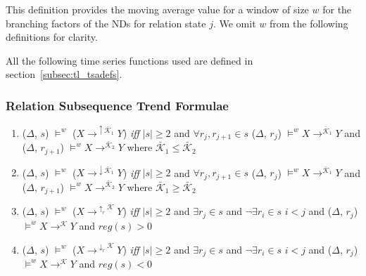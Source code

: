 This definition provides the moving average value for a window of size
$w$ for the branching
factors of the NDs for relation state $j$. We omit $w$ from the
following definitions for clarity. 

All the following time
series functions used are defined in section~\ref{subsec:tl_tsadefs}.

\subsubsection{Relation Subsequence Trend Formulae}

\begin{enumerate}

\item\label{item:ma_inc}($\Delta$, $s$) $\models^w$ ($X
\to^{\uparrow\bar{\mathcal{K}}_1} Y$) { \em iff } $\mid s \mid \ge 2$ and $ \forall r_{j},r_{j+1} \in
s$ ($\Delta$, $r_j$) 
$\models^w X \to^{\bar{\mathcal{K}}_1} Y$ and ($\Delta$, $r_{j+1}$) 
$\models^w X \to^{\bar{\mathcal{K}}_2} Y$ where $\bar{\mathcal{K}}_1 \le
\bar{\mathcal{K}}_2$



\item\label{item:ma_dec}($\Delta$, $s$) $\models^w$ ($X
\to^{\downarrow\bar{\mathcal{K}}_1} Y$) { \em iff } $\mid s \mid \ge 2$ and $ \forall r_{j},r_{j+1} \in
s$ ($\Delta$, $r_j$) 
$\models^w X \to^{\bar{\mathcal{K}}_1} Y$ and ($\Delta$, $r_{j+1}$) 
$\models^w X \to^{\bar{\mathcal{K}}_2} Y$ where $\bar{\mathcal{K}}_1 \ge
\bar{\mathcal{K}}_2$


\item\label{item:reg_tren_up}($\Delta$, $s$) $\models^w$ ($X
\to^{\uparrow_{r}\mathcal{K}} Y$) { \em iff } $\mid s \mid \ge 2$ and $\exists r_{j} \in
s$ and $\neg\exists r_i \in s$ $i < j$ and 
($\Delta$, $r_j$)  $\models^w X \to^{\mathcal{K}} Y$ and $reg(s) > 0$ 


\item\label{item:reg_tren_dn}($\Delta$, $s$) $\models^w$ ($X
\to^{\downarrow_{r}\mathcal{K}} Y$) { \em iff } $\mid s \mid \ge 2$ and $\exists r_{j} \in
s$ and $\neg\exists r_i \in s$ $i < j$ and 
($\Delta$, $r_j$)  $\models^w X \to^{\mathcal{K}} Y$ and $reg(s) < 0$ 

\end{enumerate}

